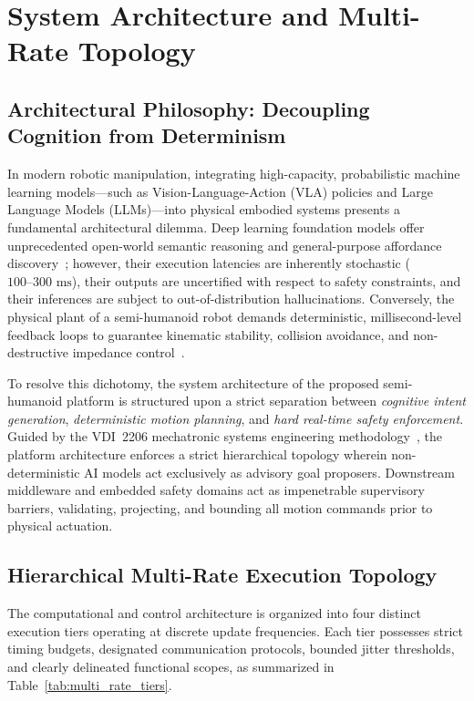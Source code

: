\section{System Architecture and Multi-Rate Topology}
\label{sec:system_architecture}

\subsection{Architectural Philosophy: Decoupling Cognition from Determinism}
In modern robotic manipulation, integrating high-capacity, probabilistic machine learning models---such as Vision-Language-Action (VLA) policies and Large Language Models (LLMs)---into physical embodied systems presents a fundamental architectural dilemma. Deep learning foundation models offer unprecedented open-world semantic reasoning and general-purpose affordance discovery~\cite{openvla,rtx}; however, their execution latencies are inherently stochastic ($100\text{--}300\text{ ms}$), their outputs are uncertified with respect to safety constraints, and their inferences are subject to out-of-distribution hallucinations. Conversely, the physical plant of a semi-humanoid robot demands deterministic, millisecond-level feedback loops to guarantee kinematic stability, collision avoidance, and non-destructive impedance control~\cite{ros2,moveit2}.

To resolve this dichotomy, the system architecture of the proposed semi-humanoid platform is structured upon a strict separation between \emph{cognitive intent generation}, \emph{deterministic motion planning}, and \emph{hard real-time safety enforcement}. Guided by the VDI~2206 mechatronic systems engineering methodology~\cite{vdi2206}, the platform architecture enforces a strict hierarchical topology wherein non-deterministic AI models act exclusively as advisory goal proposers. Downstream middleware and embedded safety domains act as impenetrable supervisory barriers, validating, projecting, and bounding all motion commands prior to physical actuation.

\subsection{Hierarchical Multi-Rate Execution Topology}
\label{subsec:multi_rate_hierarchy}
The computational and control architecture is organized into four distinct execution tiers operating at discrete update frequencies. Each tier possesses strict timing budgets, designated communication protocols, bounded jitter thresholds, and clearly delineated functional scopes, as summarized in Table~\ref{tab:multi_rate_tiers}.

